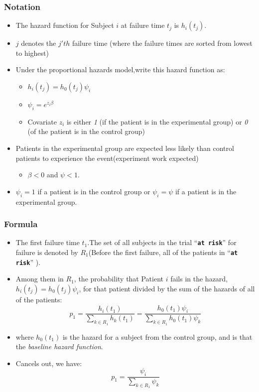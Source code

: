 \documentclass{beamer}
\newcommand{\empr}[1]{{\emph{\color{red}#1}}}
\newcommand{\pkg}[1]{{\textbf{\texttt{#1}}}}
\begin{document}
\pagebreak
\begin{frame}
\frametitle{Notation}
\begin{itemize}
\item The hazard function for Subject $i$ at failure time $t_j$ is $h_i(t_j)$.
\item $j$ denotes the $j'th$ failure time (where the failure times are sorted from lowest to highest)
\item Under the proportional hazards model,write this hazard function as: 
\begin{itemize}
\item $h_i(t_j)=h_0(t_j){\psi_i}$
\item ${\psi_i}=e^{z_i\beta}$
\item Covariate $z_i$ is either \empr{1} (if the patient is in the {\color{red}experimental group}) or \empr{0} (of the patient is in the {\color{red} control group})
\end{itemize}
\item Patients in the experimental group are expected less likely than control patients to experience the event(experiment work expected)
\begin{itemize}
\item $\beta < 0$ and $\psi < 1$.
\end{itemize}
\item {\color{red}$\psi_i = 1$ if a patient is in the control group} or {\color{red} $\psi_i=\psi$ if a patient is in the experimental group}.
\end{itemize}
\end{frame}

\pagebreak
\begin{frame}
\frametitle{Formula}
\begin{itemize}
\item The first failure time $t_1$.The set of all subjects in the trial ``\pkg{at risk}'' for failure is denoted by $R_1$(Before the first failure, all of the patients in ``\pkg{at risk}'' ).
\item Among them in $R_1$, the probability that Patient $i$ fails in the hazard, $h_i(t_j)=h_0(t_j){\psi_i}$, for that patient divided by the sum of the hazards of all of the patients:
\begin{equation}
p_1 = \frac{h_i(t_1)}{\sum\limits_{k\in R_1}^{}h_k(t_1)} = \frac{h_0(t_1)\psi_i}{\sum\limits_{k\in R_1}^{}h_0(t_1)\psi_k}
\end{equation}
\item where {\color{red}$h_0(t_1)$} is the hazard for a subject from the control group, and is that the \empr{baseline hazard function}.
\item Cancels out, we have: 
\begin{equation}
p_1 = \frac{\psi_i}{\sum\limits_{k\in R_1}^{}\psi_k}
\end{equation}
\end{itemize}
\end{frame}
\end{document}
